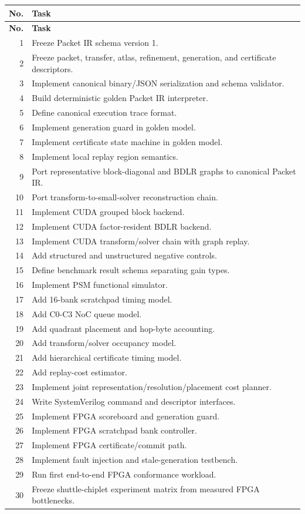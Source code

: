 \documentclass[10pt,letterpaper]{article}
\begin{document}
{{{{\small\begin{longtable}{r p{6.15in}}
\toprule
\textbf{No.} & \textbf{Task}\\
\midrule
\endfirsthead
\toprule
\textbf{No.} & \textbf{Task}\\
\midrule
\endhead
1 & Freeze Packet IR schema version 1.\\
2 & Freeze packet, transfer, atlas, refinement, generation, and certificate descriptors.\\
3 & Implement canonical binary/JSON serialization and schema validator.\\
4 & Build deterministic golden Packet IR interpreter.\\
5 & Define canonical execution trace format.\\
6 & Implement generation guard in golden model.\\
7 & Implement certificate state machine in golden model.\\
8 & Implement local replay region semantics.\\
9 & Port representative block-diagonal and BDLR graphs to canonical Packet IR.\\
10 & Port transform-to-small-solver reconstruction chain.\\
11 & Implement CUDA grouped block backend.\\
12 & Implement CUDA factor-resident BDLR backend.\\
13 & Implement CUDA transform/solver chain with graph replay.\\
14 & Add structured and unstructured negative controls.\\
15 & Define benchmark result schema separating gain types.\\
16 & Implement PSM functional simulator.\\
17 & Add 16-bank scratchpad timing model.\\
18 & Add C0-C3 NoC queue model.\\
19 & Add quadrant placement and hop-byte accounting.\\
20 & Add transform/solver occupancy model.\\
21 & Add hierarchical certificate timing model.\\
22 & Add replay-cost estimator.\\
23 & Implement joint representation/resolution/placement cost planner.\\
24 & Write SystemVerilog command and descriptor interfaces.\\
25 & Implement FPGA scoreboard and generation guard.\\
26 & Implement FPGA scratchpad bank controller.\\
27 & Implement FPGA certificate/commit path.\\
28 & Implement fault injection and stale-generation testbench.\\
29 & Run first end-to-end FPGA conformance workload.\\
30 & Freeze shuttle-chiplet experiment matrix from measured FPGA bottlenecks.\\
\bottomrule
\end{longtable}

}}}}
\end{document}
